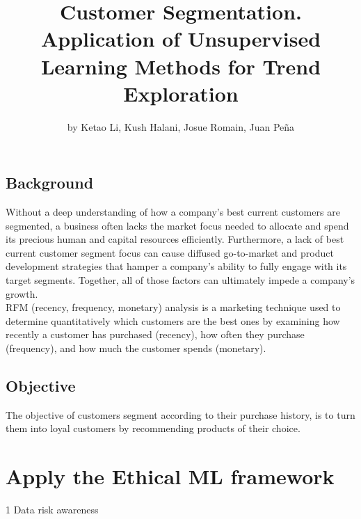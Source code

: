 \title{Customer Segmentation. Application of Unsupervised Learning Methods for
Trend Exploration}
\author{by Ketao Li, Kush Halani, Josue Romain, Juan Peña}

\maketitle


\hypertarget{background}{%
\subsection{Background}\label{background}}

Without a deep understanding of how a company's best current customers
are segmented, a business often lacks the market focus needed to
allocate and spend its precious human and capital resources efficiently.
Furthermore, a lack of best current customer segment focus can cause
diffused go-to-market and product development strategies that hamper a
company's ability to fully engage with its target segments. Together,
all of those factors can ultimately impede a company's growth.\\
RFM (recency, frequency, monetary) analysis is a marketing technique
used to determine quantitatively which customers are the best ones by
examining how recently a customer has purchased (recency), how often
they purchase (frequency), and how much the customer spends (monetary).

\hypertarget{objective}{%
\subsection{Objective}\label{objective}}

The objective of customers segment according to their purchase history,
is to turn them into loyal customers by recommending products of their
choice.

\hypertarget{apply-the-ethical-ml-framework}{%
\section{Apply the Ethical ML
framework}\label{apply-the-ethical-ml-framework}}

1 Data risk awareness

